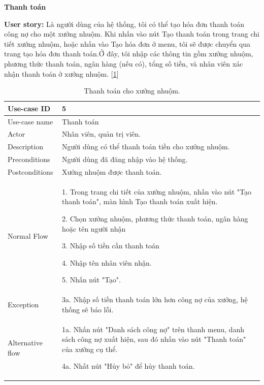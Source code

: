 \newpage
\textbf{Thanh toán}\par
\textbf{User story:} Là người dùng của hệ thống, tôi có thể tạo hóa đơn thanh toán công nợ cho một xưởng nhuộm. Khi nhấn vào nút Tạo thanh toán trong trang chi tiết xưởng nhuộm, hoặc nhấn vào Tạo hóa đơn ở menu, tôi sẽ được chuyển qua trang tạo hóa đơn thanh toán.Ở đây, tôi nhập các thông tin gồm xưởng nhuộm, phương thức thanh toán, ngân hàng (nếu có), tổng số tiền, và nhân viên xác nhận thanh toán ở xưởng nhuộm. [\ref{bang5}]
\begin{table}[!htp]
    \centering
    \begin{tabular}{|m{3cm}|m{10cm}|}
    \hline 
        Use-case ID & 5\\ \hline
        Use-case name & Thanh toán\\ \hline
        Actor & Nhân viên, quản trị viên.\\ \hline
        Description & Người dùng có thể thanh toán tiền cho xưởng nhuộm.\\ \hline
        Preconditions & Người dùng đã đăng nhập vào hệ thống.\\ \hline
        Postconditions & Xưởng nhuộm được thanh toán.\\ \hline
        Normal Flow & 
        1. Trong trang chi tiết của xưởng nhuộm, nhấn vào nút "Tạo thanh toán", màn hình Tạo thanh toán xuất hiện.\par
        2. Chọn xưởng nhuộm, phương thức thanh toán, ngân hàng hoặc tên người nhận\par
        3. Nhập số tiền cần thanh toán\par
        4. Nhập tên nhân viên nhận.\par
        5. Nhấn nút "Tạo".
        \\ \hline
        Exception & 
        3a. Nhập số tiền thanh toán lớn hơn công nợ của xưởng, hệ thống sẽ báo lỗi.
        \\ \hline
        Alternative flow & 
        1a. Nhấn nút "Danh sách công nợ" trên thanh menu, danh sách công nợ xuất hiện, sau đó nhấn vào nút "Thanh toán" của xưởng cụ thể.\par
        4a. Nhất nút "Hủy bỏ" để hủy thanh toán.
        \\ 
    \hline 
    \end{tabular}
    \caption{Thanh toán cho xưởng nhuộm.}
    \label{bang5}
\end{table}

